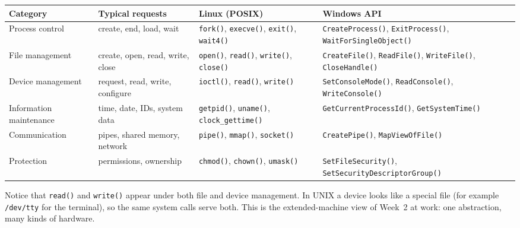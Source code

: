 \documentclass[11pt,a4paper]{article}
\newcommand{\cmd}[1]{\texttt{#1}}
\begin{document}
\begin{center}
\small
\renewcommand{\arraystretch}{1.3}
\begin{tabularx}{\linewidth}{>{\raggedright\arraybackslash}p{2.6cm} >{\raggedright\arraybackslash}p{3.0cm} >{\raggedright\arraybackslash}p{3.3cm} >{\raggedright\arraybackslash}X}
\toprule
\textbf{Category} & \textbf{Typical requests} & \textbf{Linux (POSIX)} & \textbf{Windows API} \\
\midrule
Process control & create, end, load, wait & \cmd{fork()}, \cmd{execve()}, \cmd{exit()}, \cmd{wait4()} & \cmd{CreateProcess()}, \cmd{ExitProcess()}, \cmd{WaitForSingleObject()} \\
File management & create, open, read, write, close & \cmd{open()}, \cmd{read()}, \cmd{write()}, \cmd{close()} & \cmd{CreateFile()}, \cmd{ReadFile()}, \cmd{WriteFile()}, \cmd{CloseHandle()} \\
Device management & request, read, write, configure & \cmd{ioctl()}, \cmd{read()}, \cmd{write()} & \cmd{SetConsoleMode()}, \cmd{ReadConsole()}, \cmd{WriteConsole()} \\
Information maintenance & time, date, IDs, system data & \cmd{getpid()}, \cmd{uname()}, \cmd{clock\_gettime()} & \cmd{GetCurrentProcessId()}, \cmd{GetSystemTime()} \\
Communication & pipes, shared memory, network & \cmd{pipe()}, \cmd{mmap()}, \cmd{socket()} & \cmd{CreatePipe()}, \cmd{MapViewOfFile()} \\
Protection & permissions, ownership & \cmd{chmod()}, \cmd{chown()}, \cmd{umask()} & \cmd{SetFileSecurity()}, \cmd{SetSecurityDescriptorGroup()} \\
\bottomrule
\end{tabularx}
\end{center}

Notice that \cmd{read()} and \cmd{write()} appear under both file and device management. In UNIX a device looks like a special file (for example \texttt{/dev/tty} for the terminal), so the same system calls serve both. This is the extended-machine view of Week~2 at work: one abstraction, many kinds of hardware.
\end{document}
